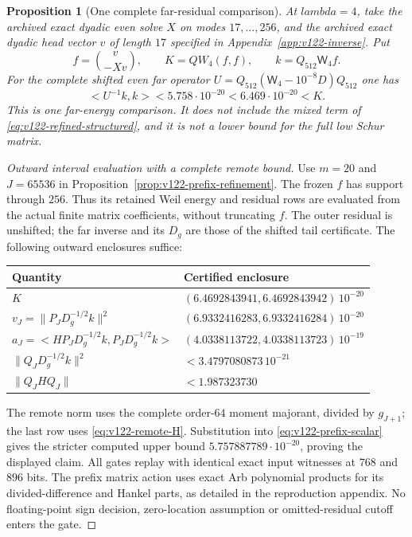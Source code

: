 \documentclass[11pt]{article}
\def\lambda{lambda}%
\def\ip#1#2{<#1,#2>}%
\newtheorem{proposition}[theorem]{Proposition}
\theoremstyle{remark}
\newcommand{\ip}[2]{\left\langle #1,#2\right\rangle}
\begin{document}
\begin{proposition}[One complete far-residual comparison]
\label{prop:v122-directional-far}
At $\lambda=4$, take the archived exact dyadic even solve $X$
on modes $17,\ldots,256$, and the archived exact dyadic head
vector $v$ of length $17$ specified in
Appendix~\ref{app:v122-inverse}. Put
\[
 f=\binom{v}{-Xv},\qquad K=QW_4(f,f),\qquad
 k=Q_{512}\mathsf W_4 f.
\]
For the complete shifted even far operator
$U=Q_{512}(\mathsf W_4-10^{-8}D)Q_{512}$ one has
\begin{equation}\label{eq:v122-directional-far}
 \ip{U^{-1}k}{k}<5.758\cdot10^{-20}
 <6.469\cdot10^{-20}<K.
\end{equation}
This is one far-energy comparison. It does not include the mixed
term of \eqref{eq:v122-refined-structured}, and it is not a lower
bound for the full low Schur matrix.
\end{proposition}
\begin{proof}[Outward interval evaluation with a complete remote bound]
Use $m=20$ and $J=65536$ in
Proposition~\ref{prop:v122-prefix-refinement}. The frozen $f$ has
support through $256$. Thus its retained Weil energy and residual
rows are evaluated from the actual finite matrix coefficients,
without truncating $f$. The outer residual is unshifted; the far
inverse and its $D_g$ are those of the shifted tail certificate.
The following outward enclosures suffice:
\begin{center}
\begin{tabular}{@{}ll@{}}
\toprule Quantity & Certified enclosure\\\midrule
$K$ & $(6.4692843941,6.4692843942)\,10^{-20}$\\
$v_J=\|P_JD_g^{-1/2}k\|^2$ & $(6.9332416283,6.9332416284)\,10^{-20}$\\
$a_J=\ip{HP_JD_g^{-1/2}k}{P_JD_g^{-1/2}k}$
 & $(4.0338113722,4.0338113723)\,10^{-19}$\\
$\|Q_JD_g^{-1/2}k\|^2$ & $<3.4797080873\,10^{-21}$\\
$\|Q_JHQ_J\|$ & $<1.987323730$\\\bottomrule
\end{tabular}
\end{center}
The remote norm uses the complete order-$64$ moment majorant,
divided by $g_{J+1}$; the last row uses
\eqref{eq:v122-remote-H}. Substitution into
\eqref{eq:v122-prefix-scalar} gives the stricter computed upper
bound $5.757887789\cdot10^{-20}$, proving the displayed claim.
All gates replay with identical exact input witnesses at $768$ and
$896$ bits. The prefix matrix action uses exact Arb polynomial
products for its divided-difference and Hankel parts, as detailed
in the reproduction appendix. No floating-point sign decision,
zero-location assumption or omitted-residual cutoff enters the gate.
\end{proof}
\end{document}

